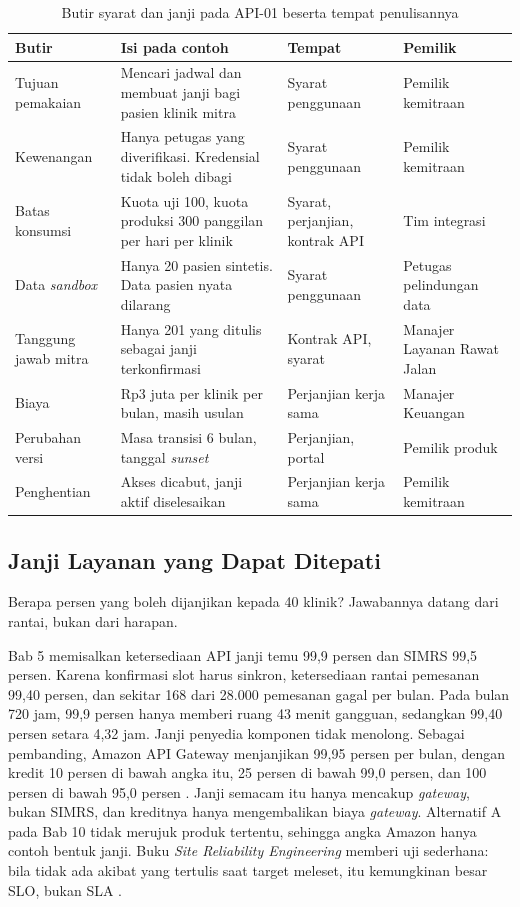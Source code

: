 \begin{table}[!htb]
  \centering
  \caption{Butir syarat dan janji pada API-01 beserta tempat penulisannya}
  \label{tab:ch11-syarat}
  \footnotesize
  \begin{tabularx}{\textwidth}{H{2.2cm}GH{2.35cm}H{2.2cm}}
    \hline
    \textbf{Butir} & \textbf{Isi pada contoh} & \textbf{Tempat} & \textbf{Pemilik} \\ \hline
    Tujuan pemakaian & Mencari jadwal dan membuat janji bagi pasien klinik mitra & Syarat penggunaan & Pemilik kemitraan \\ \hline
    Kewenangan & Hanya petugas yang diverifikasi. Kredensial tidak boleh dibagi & Syarat penggunaan & Pemilik kemitraan \\ \hline
    Batas konsumsi & Kuota uji 100, kuota produksi 300 panggilan per hari per klinik & Syarat, perjanjian, kontrak API & Tim integrasi \\ \hline
    Data \textit{sandbox} & Hanya 20 pasien sintetis. Data pasien nyata dilarang & Syarat penggunaan & Petugas pelindungan data \\ \hline
    Tanggung jawab mitra & Hanya 201 yang ditulis sebagai janji terkonfirmasi & Kontrak API, syarat & Manajer Layanan Rawat Jalan \\ \hline
    Biaya & Rp3 juta per klinik per bulan, masih usulan & Perjanjian kerja sama & Manajer Keuangan \\ \hline
    Perubahan versi & Masa transisi 6 bulan, tanggal \textit{sunset} & Perjanjian, portal & Pemilik produk \\ \hline
    Penghentian & Akses dicabut, janji aktif diselesaikan & Perjanjian kerja sama & Pemilik kemitraan \\ \hline
  \end{tabularx}
\end{table}

\subsection{Janji Layanan yang Dapat Ditepati}

Berapa persen yang boleh dijanjikan kepada 40 klinik? Jawabannya datang dari rantai, bukan dari harapan.

Bab 5 memisalkan ketersediaan API janji temu 99,9 persen dan SIMRS 99,5 persen. Karena konfirmasi slot harus sinkron, ketersediaan rantai pemesanan
99,40 persen, dan sekitar 168 dari 28.000 pemesanan gagal per bulan. Pada bulan 720 jam, 99,9 persen hanya memberi ruang 43 menit gangguan, sedangkan
99,40 persen setara 4,32 jam. Janji penyedia komponen tidak menolong. Sebagai pembanding, Amazon API Gateway menjanjikan 99,95 persen per bulan, dengan
kredit 10 persen di bawah angka itu, 25 persen di bawah 99,0 persen, dan 100 persen di bawah 95,0 persen \cite{c11-aws-sla}. Janji semacam itu hanya
mencakup \textit{gateway}, bukan SIMRS, dan kreditnya hanya mengembalikan biaya \textit{gateway}. Alternatif A pada Bab 10 tidak merujuk produk tertentu,
sehingga angka Amazon hanya contoh bentuk janji. Buku \textit{Site Reliability Engineering} memberi uji sederhana: bila tidak ada akibat yang tertulis
saat target meleset, itu kemungkinan besar SLO, bukan SLA \cite{c11-sre-slo}.


